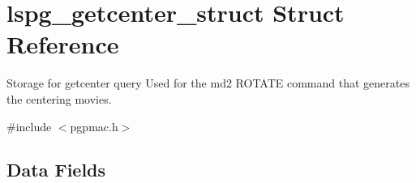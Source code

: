 \hypertarget{structlspg__getcenter__struct}{\section{lspg\-\_\-getcenter\-\_\-struct Struct Reference}
\label{structlspg__getcenter__struct}
}


Storage for getcenter query Used for the md2 R\-O\-T\-A\-T\-E command that generates the centering movies.  




{\ttfamily \#include $<$pgpmac.\-h$>$}

\subsection*{Data Fields}
